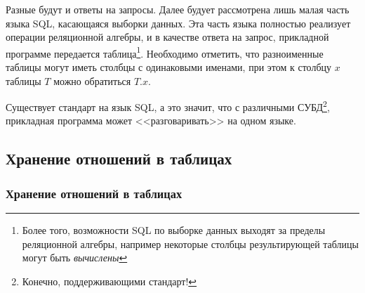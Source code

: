 Разные будут и ответы на запросы. Далее будует рассмотрена лишь малая часть языка SQL, касающаяся выборки данных. Эта часть языка полностью реализует операции реляционной алгебры, и в качестве ответа на запрос, прикладной программе передается таблица\footnote{Более того, возможности SQL по выборке данных выходят за пределы реляционной алгебры, например некоторые столбцы результирующей таблицы могут быть \emph{вычислены}}. Необходимо отметить, что разноименные таблицы могут иметь столбцы с одинаковыми именами, при этом к столбцу $x$ таблицы $T$ можно обратиться $T.x$.

Существует стандарт на язык SQL, а это значит, что с различными СУБД\footnote{Конечно, поддерживающими стандарт!}, прикладная программа может <<разговаривать>> на одном языке.

\subsection{Хранение отношений в таблицах}

\begin{frame}
    \frametitle{Хранение отношений в таблицах}
    
    \begin{table}[!ht]
        \caption{Студент}
    \end{table}
\end{frame}

